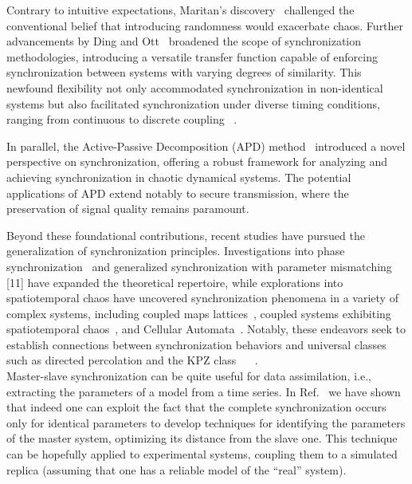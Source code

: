 \documentclass[runningheads]{llncs}
\begin{document}
Contrary to intuitive expectations, Maritan's discovery~\cite{Maritan1994} challenged the conventional belief that introducing randomness would exacerbate chaos. Further advancements by Ding and Ott~\cite{Ding1994} broadened the scope of synchronization methodologies, introducing a versatile transfer function capable of enforcing synchronization between systems with varying degrees of similarity. This newfound flexibility not only accommodated synchronization in non-identical systems but also facilitated synchronization under diverse timing conditions, ranging from continuous to discrete coupling ~\cite{Amritkar1993}\cite{Morgl1997}.

In parallel, the Active-Passive Decomposition (APD) method~\cite{Kocarev1995} introduced a novel perspective on synchronization, offering a robust framework for analyzing and achieving synchronization in chaotic dynamical systems. The potential applications of APD extend notably to secure transmission, where the preservation of signal quality remains paramount.

Beyond these foundational contributions, recent studies have pursued the generalization of synchronization principles. Investigations into phase synchronization~\cite{Rosenblum1996} and generalized synchronization with parameter mismatching [11] have expanded the theoretical repertoire, while explorations into spatiotemporal chaos have uncovered synchronization phenomena in a variety of complex systems, including coupled maps lattices~\cite{Jiang1998}, coupled systems exhibiting spatiotemporal chaos~\cite{Grassberger1999}, and Cellular Automata~\cite{Bagnoli1999}. Notably, these endeavors seek to establish connections between synchronization behaviors and universal classes such as directed percolation and the KPZ class ~\cite{Baroni2001} ~\cite{Droz2003}.\\

Master-slave synchronization can be quite useful for data assimilation, i.e., extracting the parameters of a model from a time series.
In Ref.~\cite{Bagnoli2023} we have shown that indeed one can exploit the fact that the complete synchronization occurs only for identical parameters to develop techniques for identifying the parameters of the master system, optimizing its distance from the slave one. This technique can be hopefully applied to experimental systems, coupling them to a simulated replica (assuming that one has a reliable model of the ``real'' system).\\
\end{document}
